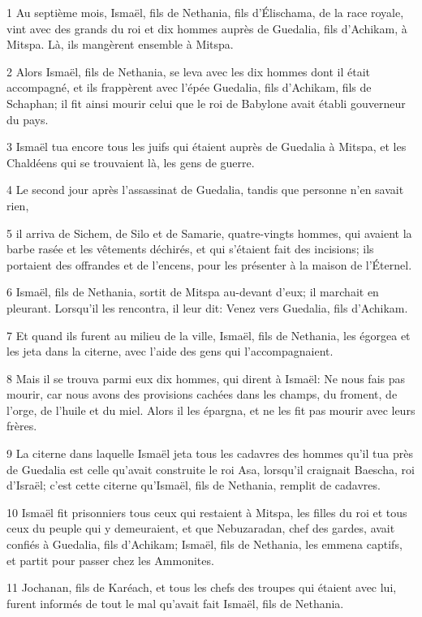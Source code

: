 \par 1 Au septième mois, Ismaël, fils de Nethania, fils d'Élischama, de la race royale, vint avec des grands du roi et dix hommes auprès de Guedalia, fils d'Achikam, à Mitspa. Là, ils mangèrent ensemble à Mitspa.
\par 2 Alors Ismaël, fils de Nethania, se leva avec les dix hommes dont il était accompagné, et ils frappèrent avec l'épée Guedalia, fils d'Achikam, fils de Schaphan; il fit ainsi mourir celui que le roi de Babylone avait établi gouverneur du pays.
\par 3 Ismaël tua encore tous les juifs qui étaient auprès de Guedalia à Mitspa, et les Chaldéens qui se trouvaient là, les gens de guerre.
\par 4 Le second jour après l'assassinat de Guedalia, tandis que personne n'en savait rien,
\par 5 il arriva de Sichem, de Silo et de Samarie, quatre-vingts hommes, qui avaient la barbe rasée et les vêtements déchirés, et qui s'étaient fait des incisions; ils portaient des offrandes et de l'encens, pour les présenter à la maison de l'Éternel.
\par 6 Ismaël, fils de Nethania, sortit de Mitspa au-devant d'eux; il marchait en pleurant. Lorsqu'il les rencontra, il leur dit: Venez vers Guedalia, fils d'Achikam.
\par 7 Et quand ils furent au milieu de la ville, Ismaël, fils de Nethania, les égorgea et les jeta dans la citerne, avec l'aide des gens qui l'accompagnaient.
\par 8 Mais il se trouva parmi eux dix hommes, qui dirent à Ismaël: Ne nous fais pas mourir, car nous avons des provisions cachées dans les champs, du froment, de l'orge, de l'huile et du miel. Alors il les épargna, et ne les fit pas mourir avec leurs frères.
\par 9 La citerne dans laquelle Ismaël jeta tous les cadavres des hommes qu'il tua près de Guedalia est celle qu'avait construite le roi Asa, lorsqu'il craignait Baescha, roi d'Israël; c'est cette citerne qu'Ismaël, fils de Nethania, remplit de cadavres.
\par 10 Ismaël fit prisonniers tous ceux qui restaient à Mitspa, les filles du roi et tous ceux du peuple qui y demeuraient, et que Nebuzaradan, chef des gardes, avait confiés à Guedalia, fils d'Achikam; Ismaël, fils de Nethania, les emmena captifs, et partit pour passer chez les Ammonites.
\par 11 Jochanan, fils de Karéach, et tous les chefs des troupes qui étaient avec lui, furent informés de tout le mal qu'avait fait Ismaël, fils de Nethania.
